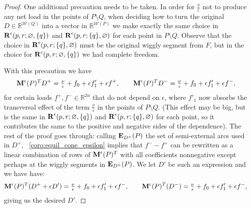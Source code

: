 \documentclass{amsart}
\theoremstyle{definition}
\newcommand{\R}{\mathbb{R}} %
\renewcommand{\b}[1]{{\boldsymbol{#1}}} %
\newcommand{\wigglySegments}{\mathcal{W}} %
\newcommand{\Rvector}{\b{\rm R}} %
\newcommand{\Reps}{\Rvector^\epsilon} %
\newcommand{\Mmatrix}{\b{\rm M}} %
\newcommand{\Ematrix}{\b{\rm E}} %
\newcommand{\Meps}{\Mmatrix^\epsilon} %
\begin{document}
\begin{proof}
One additional precaution needs to be taken. In order for $\tfrac\nu\epsilon$ not to produce any net load in the points of $P\setminus Q$, when deciding how to turn the original $D\in \R^{\wigglySegments(Q)}$ into a vector in $\R^{\wigglySegments(P)}$ we make exactly the same choice in $\Reps(p,r; \varnothing, \{q\})$ and $\Reps(p,r; \{q\}, \varnothing)$ for each point in $P\setminus Q$. Observe that the choice in $\Reps(p,r; \{q\},\varnothing)$ must be the original wiggly segment from $F$, but in the choice for $\Reps(p,r; \varnothing, \{q\})$ we had complete freedom.

With this precaution we have
\[
\Meps(P)^T D^+ = \tfrac\nu\epsilon + f_{0} + \epsilon f'_{1}  + \epsilon f^+, \qquad
\Meps(P)^T D^- = \tfrac\nu\epsilon + f_{0} + \epsilon f'_{1} + \epsilon f^-,
\]
for certain loads $f^+, f^- \in \R^{2n}$ that do not  depend on $\epsilon$, where $f'_1$ now absorbs the transversal effect of the term $\tfrac\nu\epsilon$ in the points of $P \setminus Q$. (This effect may be big, but is the same in $\Reps(p,r; \varnothing, \{q\})$ and $\Reps(p,r; \{q\}, \varnothing)$ for each point, so it contributes the same to the positive and negative sides of the dependence).
The rest of the proof goes through: calling $\Ematrix_{D^+}(P)$  the set of semi-external arcs used in $D^+$,  
~\cref{coro:equil_cone_epsilon} implies that $f^- - f^+$ can be rewritten as a linear combination of rows of $\Meps(P)^T$ with all coefficients nonnegative except perhaps at the wiggly segments in $\Ematrix_{D^+}(P)$. We let $D'$ be such an expression and we have have:
\[
\Meps(P)^T (D^+ + \epsilon D') = \tfrac\nu\epsilon +f_{0} + \epsilon f'_{1}  + \epsilon f^-, \qquad
\Meps(P)^T (D^-) = \tfrac\nu\epsilon +f_{0} + \epsilon f'_{1} + \epsilon f^-,
\]
giving us the desired $D'$.
\end{proof}
\end{document}
